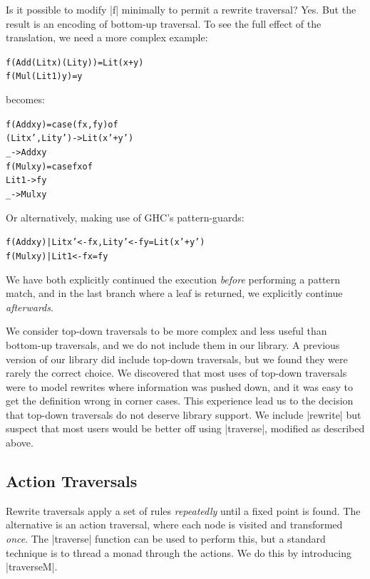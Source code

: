 \documentclass[preprint]{sigplanconf}
\newenvironment{code}{\begin{alltt}\small}{\end{alltt}}
\begin{document}
Is it possible to modify |f| minimally to permit a rewrite traversal? Yes. But the result is an encoding of bottom-up traversal. To see the full effect of the translation, we need a more complex example:

\begin{code}
f (Add (Lit x) (Lit y)  ) = Lit (x+y)
f (Mul (Lit 1) y        ) = y
\end{code}

\noindent becomes:

\begin{code}
f (Add x y) = case  (f x     , f y     ) of
                    (Lit x'  , Lit y'  ) -> Lit (x'+y')
                    _ -> Add x y
f (Mul x y) = case  f x of
                    Lit 1 -> f y
                    _ -> Mul x y
\end{code}

\noindent Or alternatively, making use of GHC's pattern-guards:

\begin{code}
f (Add  x y) | Lit x'  <- f x, Lit y' <- f y = Lit (x'+y')
f (Mul  x y) | Lit 1   <- f x = f y
\end{code}

We have both explicitly continued the execution \textit{before} performing a pattern match, and in the last branch where a leaf is returned, we explicitly continue \textit{afterwards}.

We consider top-down traversals to be more complex and less useful than bottom-up traversals, and we do not include them in our library. A previous version of our library did include top-down traversals, but we found they were rarely the correct choice. We discovered that most uses of top-down traversals were to model rewrites where information was pushed down, and it was easy to get the definition wrong in corner cases. This experience lead us to the decision that top-down traversals do not deserve library support. We include |rewrite| but suspect that most users would be better off using |traverse|, modified as described above.

\subsection{Action Traversals}

Rewrite traversals apply a set of rules \textit{repeatedly} until a fixed point is found. The alternative is an action traversal, where each node is visited and transformed \textit{once}. The |traverse| function can be used to perform this, but a standard technique is to thread a monad through the actions. We do this by introducing |traverseM|.
\end{document}
